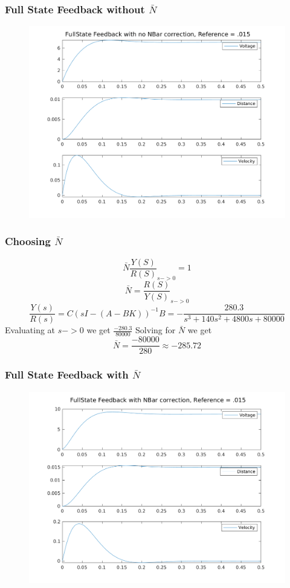 \documentclass{beamer}
\begin{document}
\begin{frame}
\frametitle{Full State Feedback without $\bar{N}$}
\begin{figure}
\includegraphics[scale=.5]{images/FullState_Feedback_No_nBar_ref_p015.png}
\end{figure}
\end{frame}

\begin{frame}
\frametitle{Choosing $\bar{N}$}
$$\bar{N}\frac{Y(S)}{R(S)}_{s->0} = 1 $$
$$ \bar{N} = \frac{R(S)}{Y(S)}_{s->0} $$
$$ \frac{Y(s)}{R(s)} = C(sI - (A-BK))^{-1}B = -\frac{280.3}{s^3+140s^2+4800s+80000} $$
Evaluating at $s->0$ we get $ \frac{-280.3}{80000} $
Solving for $\bar{N}$ we get
$$ \bar{N} = \frac{-80000}{280} \approx -285.72 $$
\end{frame}

\begin{frame}
\frametitle{Full State Feedback with $\bar{N}$}
\begin{figure}
\centering
\includegraphics[scale=.5]{images/FullState_Feedback_with_nBar_ref_p015.png}
\end{figure}
\end{frame}
\end{document}
